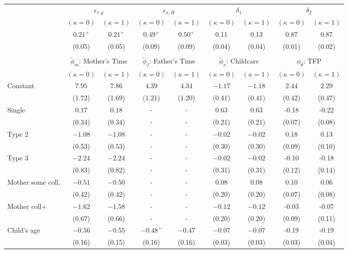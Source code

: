 \begin{tabular}{lcccccccc}\\\toprule
 & \multicolumn{2}{c}{$\epsilon_{\tau,g}$} & \multicolumn{2}{c}{$\epsilon_{x,H}$} & \multicolumn{2}{c}{$\delta_{1}$} & \multicolumn{2}{c}{$\delta_{2}$} \\
& $(\kappa=0)$ & $(\kappa=1)$ & $(\kappa=0)$ & $(\kappa=1)$ & $(\kappa=0)$ & $(\kappa=1)$ & $(\kappa=0)$ & $(\kappa=1)$ \\\cmidrule(r){2-3}\cmidrule(r){4-5}\cmidrule(r){6-7}\cmidrule(r){8-9}
&$0.21^{+}$&$0.21^{+}$&$0.49^{+}$&$0.50^{+}$&0.11&0.13&0.87&0.87\\
&(0.05)&(0.05)&(0.09)&(0.09)&(0.04)&(0.04)&(0.01)&(0.02)\\
&&&&&&&&\\
 & \multicolumn{2}{c}{$\tilde{\phi}_{m}$: Mother's Time} & \multicolumn{2}{c}{$\tilde{\phi}_{f}$: Father's Time} & \multicolumn{2}{c}{$\tilde{\phi}_{x}$: Childcare} & \multicolumn{2}{c}{$\phi_{\theta}$: TFP} \\
& $(\kappa=0)$ & $(\kappa=1)$ & $(\kappa=0)$ & $(\kappa=1)$ & $(\kappa=0)$ & $(\kappa=1)$ & $(\kappa=0)$ & $(\kappa=1)$ \\\cmidrule(r){2-3}\cmidrule(r){4-5}\cmidrule(r){6-7}\cmidrule(r){8-9}
Constant&$7.95$&$7.86$&$4.39$&$4.34$&$-1.17$&$-1.18$&2.44&2.29\\
&(1.72)&(1.69)&(1.21)&(1.20)&(0.41)&(0.41)&(0.42)&(0.47)\\
Single&$0.17$&$0.18$&-&-&$0.63$&$0.63$&-0.18&-0.22\\
&(0.34)&(0.34)&-&-&(0.21)&(0.21)&(0.07)&(0.08)\\
Type 2&$-1.08$&$-1.08$&-&-&$-0.02$&$-0.02$&0.18&0.13\\
&(0.53)&(0.53)&-&-&(0.30)&(0.30)&(0.09)&(0.10)\\
Type 3&$-2.24$&$-2.24$&-&-&$-0.02$&$-0.02$&-0.10&-0.18\\
&(0.83)&(0.82)&-&-&(0.31)&(0.31)&(0.12)&(0.14)\\
Mother some coll.&$-0.51$&$-0.50$&-&-&$0.08$&$0.08$&0.10&0.06\\
&(0.42)&(0.42)&-&-&(0.20)&(0.20)&(0.07)&(0.08)\\
Mother coll+&$-1.62$&$-1.58$&-&-&$-0.12$&$-0.12$&-0.03&-0.07\\
&(0.67)&(0.66)&-&-&(0.20)&(0.20)&(0.09)&(0.11)\\
Child's age&$-0.56$&$-0.55$&$-0.48^{+}$&$-0.47$&$-0.07$&$-0.07$&-0.19&-0.19\\
&(0.16)&(0.15)&(0.16)&(0.16)&(0.03)&(0.03)&(0.03)&(0.04)\\

\end{tabular}
